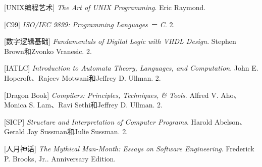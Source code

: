 \begin{BookBibliographyEntry}

[UNIX编程艺术] \emph{The Art of UNIX Programming}. Eric Raymond.

\end{BookBibliographyEntry}

\begin{BookBibliographyEntry}

[C99] \emph{ISO/\BookSplit{}IEC 9899:\BookSplit{} Programming Languages － C}. 2.\BookSplit{}

\end{BookBibliographyEntry}

\begin{BookBibliographyEntry}

[数字逻辑基础] \emph{Fundamentals of Digital Logic with VHDL Design}. Stephen Brown和Zvonko Vranesic. 2.\BookSplit{}

\end{BookBibliographyEntry}

\begin{BookBibliographyEntry}

[IATLC] \emph{Introduction to Automata Theory, Languages, and Computation}. John E.\BookSplit{} Hopcroft、Rajeev Motwani和Jeffrey D.\BookSplit{} Ullman. 2.\BookSplit{}

\end{BookBibliographyEntry}

\begin{BookBibliographyEntry}

[Dragon Book] \emph{Compilers:\BookSplit{} Principles, Techniques, \& Tools}. Alfred V.\BookSplit{} Aho、Monica S.\BookSplit{} Lam、Ravi Sethi和Jeffrey D.\BookSplit{} Ullman. 2.\BookSplit{}

\end{BookBibliographyEntry}

\begin{BookBibliographyEntry}

[SICP] \emph{Structure and Interpretation of Computer Programs}. Harold Abelson、Gerald Jay Sussman和Julie Sussman. 2.\BookSplit{}

\end{BookBibliographyEntry}

\begin{BookBibliographyEntry}

[人月神话] \emph{The Mythical Man-Month:\BookSplit{} Essays on Software Engineering}. Frederick P.\BookSplit{} Brooks, Jr.\BookSplit{}. Anniversary Edition.\BookSplit{}

\end{BookBibliographyEntry}

